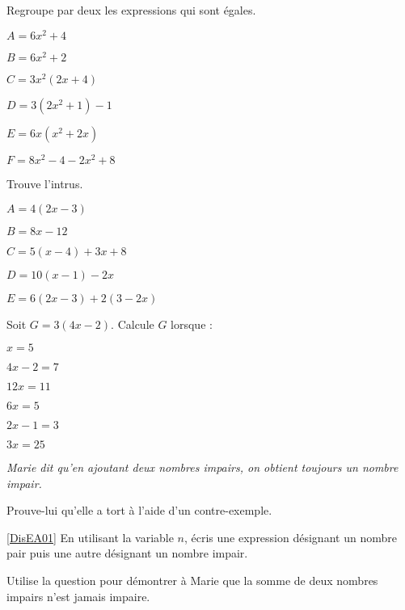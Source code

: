 \begin{exercice}
Regroupe par deux les expressions qui sont égales.
\begin{colenumerate}{2}
\item $A = 6x^2 + 4$
\item $B = 6x^2 + 2$
\item $C = 3x^2(2x + 4)$
\item $D = 3(2x^2 + 1) - 1$
\item $E = 6x(x^2 + 2x)$
\item $F = 8x^2 - 4 - 2x^2 + 8$
\end{colenumerate}
\end{exercice}

\begin{exercice}
Trouve l'intrus.
\begin{colenumerate}{2}
\item $A = 4(2x - 3)$
\item $B = 8x - 12$
\item $C = 5(x - 4) + 3x + 8$
\item $D = 10(x - 1) - 2x$
\item $E = 6(2x - 3) + 2(3 - 2x)$
\end{colenumerate}
\end{exercice}

\begin{exercice}[Substitution]
Soit $G = 3(4x - 2)$. Calcule $G$ lorsque :

\begin{colenumerate}{2} 
\item $x = 5$
\item $4x - 2 = 7$
\item $12x = 11$
\item $6x = 5$
\item $2x - 1 = 3$
\item $3x = 25$
\end{colenumerate} 
\end{exercice}

\begin{exercice}[]
\textsl{Marie dit qu'en ajoutant deux nombres impairs, on obtient toujours un nombre impair.}

\begin{colenumerate}{1} 
\item Prouve-lui qu'elle a tort à l'aide d'un contre-exemple.
\item \ref{DisEA01} En utilisant la variable $n$, écris une expression désignant un nombre pair puis une autre désignant un nombre impair.
\item Utilise la question \label{DisEA01} pour démontrer à Marie que la somme de deux nombres impairs n'est jamais impaire.
\end{colenumerate} 
\end{exercice}

